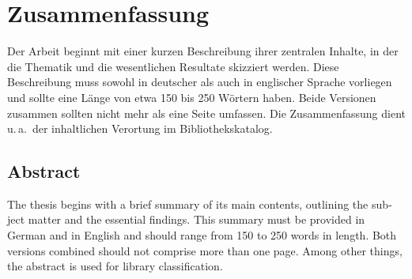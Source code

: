 
\thispagestyle{empty}

\section*{Zusammenfassung}


Der Arbeit beginnt mit einer kurzen Beschreibung ihrer zentralen Inhalte, in
der die Thematik und die wesentlichen Resultate skizziert werden.  Diese
Beschreibung muss sowohl in deutscher als auch in englischer Sprache vorliegen
und sollte eine Länge von etwa 150 bis 250 Wörtern haben.  Beide Versionen
zusammen sollten nicht mehr als eine Seite umfassen.  Die Zusammenfassung
dient u.\,a.\ der inhaltlichen Verortung im Bibliothekskatalog.

{
  \begin{otherlanguage}{english}
    \section*{Abstract}

    The thesis begins with a brief summary of its main contents, outlining the
    subject matter and the essential findings.  This summary must be provided
    in German and in English and should range from 150 to 250 words in length.
    Both versions combined should not comprise more than one page.  Among
    other things, the abstract is used for library classification.
  \end{otherlanguage}
}